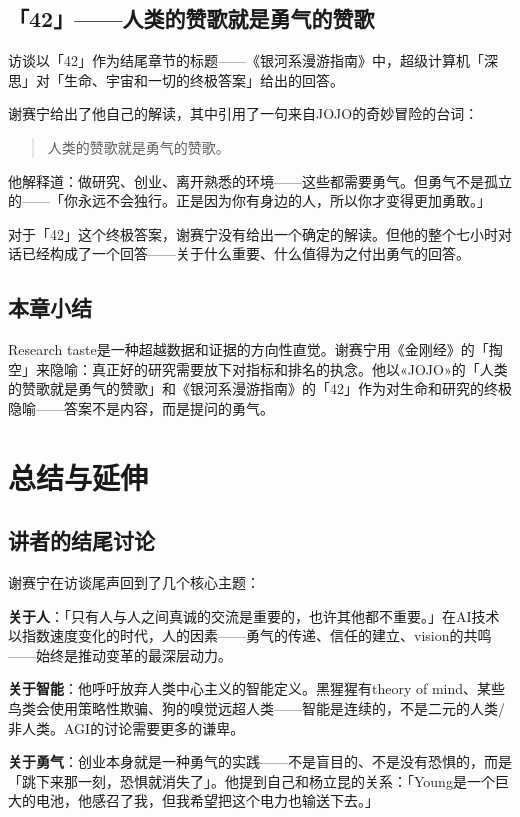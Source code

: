 \documentclass[a4paper]{article}
\begin{document}
\subsection{「42」——人类的赞歌就是勇气的赞歌}

访谈以「42」作为结尾章节的标题——《银河系漫游指南》中，超级计算机「深思」对「生命、宇宙和一切的终极答案」给出的回答。

谢赛宁给出了他自己的解读，其中引用了一句来自JOJO的奇妙冒险的台词：

\begin{quote}
人类的赞歌就是勇气的赞歌。
\end{quote}

他解释道：做研究、创业、离开熟悉的环境——这些都需要勇气。但勇气不是孤立的——「你永远不会独行。正是因为你有身边的人，所以你才变得更加勇敢。」

对于「42」这个终极答案，谢赛宁没有给出一个确定的解读。但他的整个七小时对话已经构成了一个回答——关于什么重要、什么值得为之付出勇气的回答。

\subsection{本章小结}
Research taste是一种超越数据和证据的方向性直觉。谢赛宁用《金刚经》的「掏空」来隐喻：真正好的研究需要放下对指标和排名的执念。他以«JOJO»的「人类的赞歌就是勇气的赞歌」和《银河系漫游指南》的「42」作为对生命和研究的终极隐喻——答案不是内容，而是提问的勇气。

\section{总结与延伸}

\subsection{讲者的结尾讨论}

谢赛宁在访谈尾声回到了几个核心主题：

\textbf{关于人}：「只有人与人之间真诚的交流是重要的，也许其他都不重要。」在AI技术以指数速度变化的时代，人的因素——勇气的传递、信任的建立、vision的共鸣——始终是推动变革的最深层动力。

\textbf{关于智能}：他呼吁放弃人类中心主义的智能定义。黑猩猩有theory of mind、某些鸟类会使用策略性欺骗、狗的嗅觉远超人类——智能是连续的，不是二元的人类/非人类。AGI的讨论需要更多的谦卑。

\textbf{关于勇气}：创业本身就是一种勇气的实践——不是盲目的、不是没有恐惧的，而是「跳下来那一刻，恐惧就消失了」。他提到自己和杨立昆的关系：「Young是一个巨大的电池，他感召了我，但我希望把这个电力也输送下去。」
\end{document}
